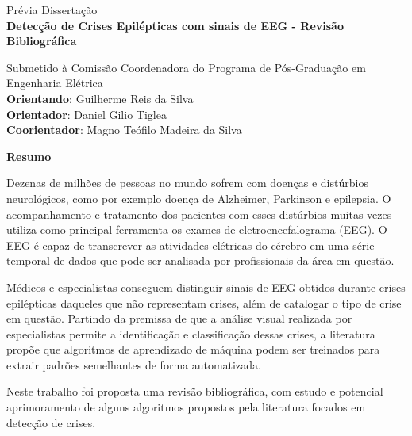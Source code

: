 \documentclass[]{article}
\begin{document}
	
	\begin{center}
		{\large Prévia Dissertação} \\[1.5cm]
		
		{\LARGE \textbf{Detecção de Crises Epilépticas com sinais de EEG - Revisão Bibliográfica}} \\[1.5cm]
	\end{center}
	
	\noindent Submetido à Comissão Coordenadora do Programa de Pós-Graduação em Engenharia Elétrica \\[1.5cm]
	
	\noindent
	\textbf{Orientando}: Guilherme Reis da Silva \\
	\textbf{Orientador}: Daniel Gilio Tiglea \\
	\textbf{Coorientador}: Magno Teófilo Madeira da Silva \\
	
	\vspace{1.5cm} %
	
	\begin{center}
		\textbf{\Large Resumo}
	\end{center}
	
	\vspace{0.5cm} %
	
	\noindent %
	
	Dezenas de milhões de pessoas no mundo sofrem com doenças e distúrbios neurológicos, como por exemplo doença de Alzheimer, Parkinson e epilepsia. O acompanhamento e tratamento dos pacientes com esses distúrbios muitas vezes utiliza como principal ferramenta os exames de eletroencefalograma (EEG). O EEG é capaz de transcrever as atividades elétricas do cérebro em uma série temporal de dados que pode ser analisada por profissionais da área em questão.

	Médicos e especialistas conseguem distinguir sinais de EEG obtidos durante crises epilépticas daqueles que não representam crises, além de catalogar o tipo de crise em questão.
	Partindo da premissa de que a análise visual realizada por especialistas permite a identificação e classificação dessas crises, a literatura propõe que algoritmos de aprendizado de máquina podem ser treinados para extrair padrões semelhantes de forma automatizada.
	
	Neste trabalho foi proposta uma revisão bibliográfica, com estudo e potencial aprimoramento de alguns algoritmos propostos pela literatura focados em detecção de crises. 
	
\end{document}

